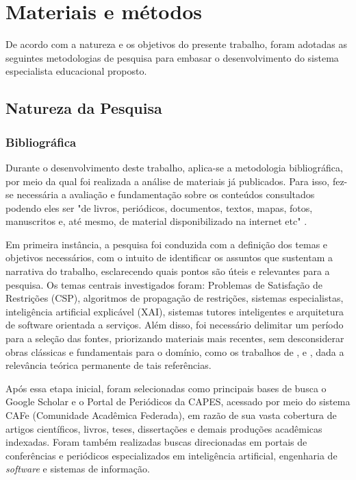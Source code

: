 \chapter{Materiais e métodos}
\label{cap:03}
De acordo com a natureza e os objetivos do presente trabalho, foram adotadas as seguintes metodologias de pesquisa para
embasar o desenvolvimento do sistema especialista educacional proposto.

\section{Natureza da Pesquisa}
\label{sec:natureza-pesquisa}

\subsection{Bibliográfica}
Durante o desenvolvimento deste trabalho, aplica-se a metodologia bibliográfica, por meio da qual foi realizada
a análise de materiais já publicados. Para isso, fez-se necessária a avaliação e fundamentação sobre os conteúdos
consultados podendo eles ser "de livros, periódicos, documentos, textos,
mapas, fotos, manuscritos e, até mesmo, de material
disponibilizado na internet etc" \cite{fontelles2009}.

Em primeira instância, a pesquisa foi conduzida com a definição dos temas e objetivos necessários, com o intuito de identificar
os assuntos que sustentam a narrativa do trabalho, esclarecendo quais pontos são úteis e relevantes para a pesquisa. Os temas
centrais investigados foram: Problemas de Satisfação de Restrições (CSP), algoritmos de propagação de restrições,
sistemas especialistas, inteligência artificial explicável (XAI), sistemas tutores inteligentes e arquitetura de software
orientada a serviços. Além disso, foi necessário delimitar um período para a seleção das fontes, priorizando materiais mais
recentes, sem desconsiderar obras clássicas e fundamentais para o domínio, como os trabalhos de \textcite{Clancey1983},
\textcite{Mackworth1977} e \textcite{Russell2010}, dada a relevância teórica permanente de tais referências.

Após essa etapa inicial, foram selecionadas como principais bases de busca o Google Scholar e o Portal de Periódicos da CAPES,
acessado por meio do sistema CAFe (Comunidade Acadêmica Federada), em razão de sua vasta cobertura de artigos científicos,
livros, teses, dissertações e demais produções acadêmicas indexadas. Foram também realizadas buscas direcionadas em portais de
conferências e periódicos especializados em inteligência artificial, engenharia de \textit{software} e sistemas de informação.

